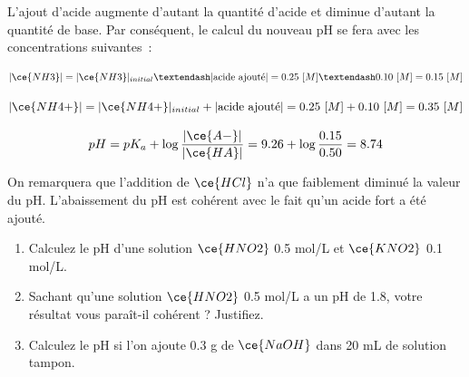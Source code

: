 \documentclass[
  11pt,
  french,
  a4paper,
  openany]{book}
\providecommand{\tightlist}{%
  \setlength{\itemsep}{0pt}\setlength{\parskip}{0pt}}
\begin{document}
L'ajout d'acide augmente d'autant la quantité d'acide et diminue d'autant la quantité de base. Par conséquent, le calcul du nouveau pH se fera avec les concentrations suivantes~:

\[
|\ce{NH3}| = |\ce{NH3}|_{initial} – |\text{acide ajouté}| = 0.25\ [M] – 0.10\ [M] = 0.15\ [M]
\]

\[
|\ce{NH4+}| = |\ce{NH4+}|_{initial} + |\text{acide ajouté}| = 0.25\ [M] + 0.10\ [M] = 0.35\ [M]
\]

\[
pH = pK_a + \log \frac{|\ce{A-}|}{|\ce{HA}|} = 9.26 + \log \frac{0.15}{0.50} = 8.74
\]

On remarquera que l'addition de \(\ce{HCl}\) n'a que faiblement diminué la valeur du pH. L'abaissement du pH est cohérent avec le fait qu'un acide fort a été ajouté.

\clearpage

\begin{Exercise}

\begin{enumerate}
\def\labelenumi{\alph{enumi}.}
\tightlist
\item
  Calculez le pH d'une solution \(\ce{HNO2}\) 0.5 mol/L et \(\ce{KNO2}\) 0.1 mol/L.
\item
  Sachant qu'une solution \(\ce{HNO2}\) 0.5 mol/L a un pH de 1.8, votre résultat vous paraît-il cohérent ? Justifiez.
\item
  Calculez le pH si l'on ajoute 0.3 g de \(\ce{NaOH}\) dans 20 mL de solution tampon.
\end{enumerate}


\end{Exercise}
\end{document}
